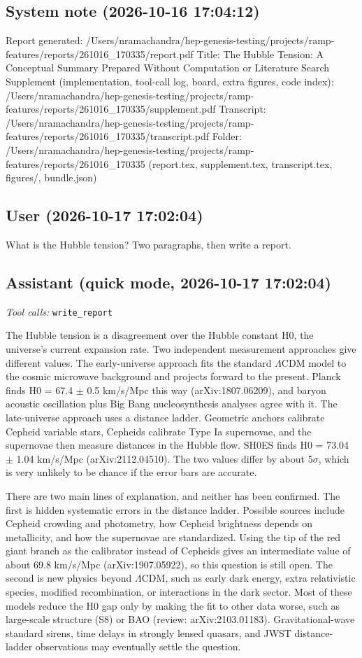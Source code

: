 \documentclass[11pt,a4paper]{article}
\begin{document}
\subsection*{System note \small(2026-10-16 17:04:12)}
Report generated: /Users/nramachandra/hep-genesis-testing/projects/ramp-features/reports/261016\_170335/report.pdf Title: The Hubble Tension: A Conceptual Summary Prepared Without Computation or Literature Search Supplement (implementation, tool-call log, board, extra figures, code index): /Users/nramachandra/hep-genesis-testing/projects/ramp-features/reports/261016\_170335/supplement.pdf Transcript: /Users/nramachandra/hep-genesis-testing/projects/ramp-features/reports/261016\_170335/transcript.pdf Folder: /Users/nramachandra/hep-genesis-testing/projects/ramp-features/reports/261016\_170335 (report.tex, supplement.tex, transcript.tex, figures/, bundle.json)

\subsection*{User \small(2026-10-17 17:02:04)}
What is the Hubble tension? Two paragraphs, then write a report.

\subsection*{Assistant \small(quick mode, 2026-10-17 17:02:04)}
\textit{Tool calls:} \texttt{write\_report}\par
The Hubble tension is a disagreement over the Hubble constant H0, the universe's current expansion rate. Two independent measurement approaches give different values. The early-universe approach fits the standard $\Lambda$CDM model to the cosmic microwave background and projects forward to the present. Planck finds H0 = 67.4 $\pm$ 0.5 km/s/Mpc this way (arXiv:1807.06209), and baryon acoustic oscillation plus Big Bang nucleosynthesis analyses agree with it. The late-universe approach uses a distance ladder. Geometric anchors calibrate Cepheid variable stars, Cepheids calibrate Type Ia supernovae, and the supernovae then measure distances in the Hubble flow. SH0ES finds H0 = 73.04 $\pm$ 1.04 km/s/Mpc (arXiv:2112.04510). The two values differ by about 5$\sigma$, which is very unlikely to be chance if the error bars are accurate.

There are two main lines of explanation, and neither has been confirmed. The first is hidden systematic errors in the distance ladder. Possible sources include Cepheid crowding and photometry, how Cepheid brightness depends on metallicity, and how the supernovae are standardized. Using the tip of the red giant branch as the calibrator instead of Cepheids gives an intermediate value of about 69.8 km/s/Mpc (arXiv:1907.05922), so this question is still open. The second is new physics beyond $\Lambda$CDM, such as early dark energy, extra relativistic species, modified recombination, or interactions in the dark sector. Most of these models reduce the H0 gap only by making the fit to other data worse, such as large-scale structure (S8) or BAO (review: arXiv:2103.01183). Gravitational-wave standard sirens, time delays in strongly lensed quasars, and JWST distance-ladder observations may eventually settle the question.
\end{document}

